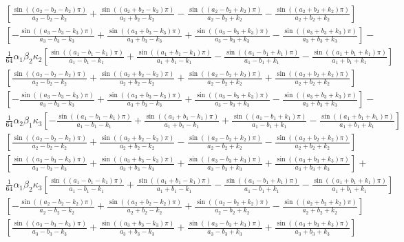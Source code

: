 \documentclass[12pt,onecolumn]{article}
\begin{document}
\begin{equation}
\begin{split}
   \left[\frac{\sin((a_2 - b_2 - k_2) \pi)}{a_2 - b_2 - k_2} + 
    \frac{\sin((a_2 + b_2 - k_2) \pi)}{a_2 + b_2 - k_2} - 
    \frac{\sin((a_2 - b_2 + k_2) \pi)}{a_2 - b_2 + k_2} - 
    \frac{\sin((a_2 + b_2 + k_2) \pi)}{a_2 + b_2 + k_2}\right]\\
   \left[-\frac{\sin((a_3 - b_3 - k_3) \pi)}{a_3 - b_3 - k_3} + 
    \frac{\sin((a_3 + b_3 - k_3) \pi)}{a_3 + b_3 - k_3} + 
    \frac{\sin((a_3 - b_3 + k_3) \pi)}{a_3 - b_3 + k_3} - 
    \frac{\sin((a_3 + b_3 + k_3) \pi)}{a_3 + b_3 + k_3}\right] - \\
 \frac{1}{64} \alpha_1 \beta_2 \kappa_2 \left[\frac{\sin((a_1 - b_1 - k_1) \pi)}{a_1 - b_1 - k_1} + 
    \frac{\sin((a_1 + b_1 - k_1) \pi)}{a_1 + b_1 - k_1} - 
    \frac{\sin((a_1 - b_1 + k_1) \pi)}{a_1 - b_1 + k_1} - 
    \frac{\sin((a_1 + b_1 + k_1) \pi)}{a_1 + b_1 + k_1}\right]\\
   \left[\frac{\sin((a_2 - b_2 - k_2) \pi)}{a_2 - b_2 - k_2} + 
    \frac{\sin((a_2 + b_2 - k_2) \pi)}{a_2 + b_2 - k_2} + 
    \frac{\sin((a_2 - b_2 + k_2) \pi)}{a_2 - b_2 + k_2} + 
    \frac{\sin((a_2 + b_2 + k_2) \pi)}{a_2 + b_2 + k_2}\right]\\
   \left[-\frac{\sin((a_3 - b_3 - k_3) \pi)}{a_3 - b_3 - k_3} + 
    \frac{\sin((a_3 + b_3 - k_3) \pi)}{a_3 + b_3 - k_3} + 
    \frac{\sin((a_3 - b_3 + k_3) \pi)}{a_3 - b_3 + k_3} - 
    \frac{\sin((a_3 + b_3 + k_3) \pi)}{a_3 + b_3 + k_3}\right] -\\
 \frac{1}{64} \alpha_2 \beta_1 \kappa_3 \left[-\frac{\sin((a_1 - b_1 - k_1) \pi)}{
     a_1 - b_1 - k_1} + \frac{\sin((a_1 + b_1 - k_1) \pi)}{a_1 + b_1 - k_1} + 
    \frac{\sin((a_1 - b_1 + k_1) \pi)}{a_1 - b_1 + k_1} - 
    \frac{\sin((a_1 + b_1 + k_1) \pi)}{a_1 + b_1 + k_1}\right]\\
   \left[\frac{\sin((a_2 - b_2 - k_2) \pi)}{a_2 - b_2 - k_2} + 
    \frac{\sin((a_2 + b_2 - k_2) \pi)}{a_2 + b_2 - k_2} - 
    \frac{\sin((a_2 - b_2 + k_2) \pi)}{a_2 - b_2 + k_2} - 
    \frac{\sin((a_2 + b_2 + k_2) \pi)}{a_2 + b_2 + k_2}\right]\\
   \left[\frac{\sin((a_3 - b_3 - k_3) \pi)}{a_3 - b_3 - k_3} + 
    \frac{\sin((a_3 + b_3 - k_3) \pi)}{a_3 + b_3 - k_3} + 
    \frac{\sin((a_3 - b_3 + k_3) \pi)}{a_3 - b_3 + k_3} + 
    \frac{\sin((a_3 + b_3 + k_3) \pi)}{a_3 + b_3 + k_3}\right] + \\
 \frac{1}{64} \alpha_1 \beta_2 \kappa_3 \left[\frac{\sin((a_1 - b_1 - k_1) \pi)}{a_1 - b_1 - k_1} + 
    \frac{\sin((a_1 + b_1 - k_1) \pi)}{a_1 + b_1 - k_1} - 
    \frac{\sin((a_1 - b_1 + k_1) \pi)}{a_1 - b_1 + k_1} - 
    \frac{\sin((a_1 + b_1 + k_1) \pi)}{a_1 + b_1 + k_1}\right]\\
   \left[-\frac{\sin((a_2 - b_2 - k_2) \pi)}{a_2 - b_2 - k_2} + 
    \frac{\sin((a_2 + b_2 - k_2) \pi)}{a_2 + b_2 - k_2} + 
    \frac{\sin((a_2 - b_2 + k_2) \pi)}{a_2 - b_2 + k_2} - 
    \frac{\sin((a_2 + b_2 + k_2) \pi)}{a_2 + b_2 + k_2}\right]\\
   \left[\frac{\sin((a_3 - b_3 - k_3) \pi)}{a_3 - b_3 - k_3} + 
    \frac{\sin((a_3 + b_3 - k_3) \pi)}{a_3 + b_3 - k_3} + 
    \frac{\sin((a_3 - b_3 + k_3) \pi)}{a_3 - b_3 + k_3} + 
    \frac{\sin((a_3 + b_3 + k_3) \pi)}{a_3 + b_3 + k_3}\right]
\end{split}
\end{equation}
\end{document}
